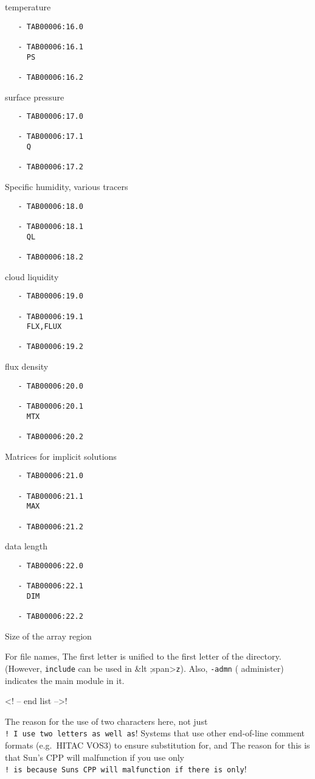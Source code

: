 temperature

\begin{verbatim}
   - TAB00006:16.0
 
   - TAB00006:16.1 
     PS
 
   - TAB00006:16.2 
\end{verbatim}

surface pressure

\begin{verbatim}
   - TAB00006:17.0
 
   - TAB00006:17.1 
     Q
 
   - TAB00006:17.2 
\end{verbatim}

Specific humidity, various tracers

\begin{verbatim}
   - TAB00006:18.0
 
   - TAB00006:18.1 
     QL
 
   - TAB00006:18.2 
\end{verbatim}

cloud liquidity

\begin{verbatim}
   - TAB00006:19.0
 
   - TAB00006:19.1 
     FLX,FLUX
 
   - TAB00006:19.2 
\end{verbatim}

flux density

\begin{verbatim}
   - TAB00006:20.0
 
   - TAB00006:20.1 
     MTX
 
   - TAB00006:20.2 
\end{verbatim}

Matrices for implicit solutions

\begin{verbatim}
   - TAB00006:21.0
 
   - TAB00006:21.1 
     MAX
 
   - TAB00006:21.2 
\end{verbatim}

data length

\begin{verbatim}
   - TAB00006:22.0
 
   - TAB00006:22.1 
     DIM
 
   - TAB00006:22.2 
\end{verbatim}

Size of the array region

For file names, The first letter is unified to the first letter of the
directory. (However, {\texttt{include}} can be used in \&lt
;span\textgreater{}\texttt{z}). Also, {\texttt{-admn}} ( administer)
indicates the main module in it.

\textless! -- end list --\textgreater!

The reason for the use of two characters here, not just
\texttt{!\ I\ use\ two\ letters\ as\ well\ as}! Systems that use other
end-of-line comment formats (e.g.~HITAC VOS3) to ensure substitution
for, and The reason for this is that Sun's CPP will malfunction if you
use only
\texttt{!\ is\ because\ Sun\textquotesingle{}s\ CPP\ will\ malfunction\ if\ there\ is\ only}!
